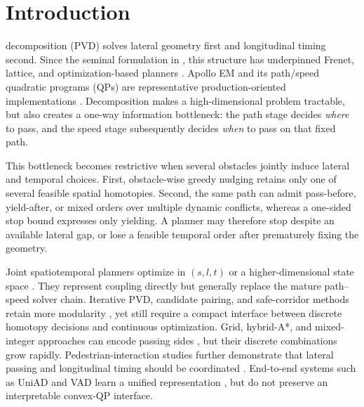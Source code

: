 \section{Introduction}
\label{sec:introduction}

 decomposition (PVD) solves lateral geometry first and longitudinal timing second. Since the seminal formulation in \cite{kant1986pvd}, this structure has underpinned Frenet, lattice, and optimization-based planners \cite{werling2010,dolgov2010,mcnaughton2011lattice,ziegler2014}. Apollo EM and its path/speed quadratic programs (QPs) are representative production-oriented implementations \cite{fan2018baidu,apollo2024,zhou2021pathqp,zhou2021dliaps}. Decomposition makes a high-dimensional problem tractable, but also creates a one-way information bottleneck: the path stage decides \emph{where} to pass, and the speed stage subsequently decides \emph{when} to pass on that fixed path.

This bottleneck becomes restrictive when several obstacles jointly induce lateral and temporal choices. First, obstacle-wise greedy nudging retains only one of several feasible spatial homotopies. Second, the same path can admit pass-before, yield-after, or mixed orders over multiple dynamic conflicts, whereas a one-sided stop bound expresses only yielding. A planner may therefore stop despite an available lateral gap, or lose a feasible temporal order after prematurely fixing the geometry.

Joint spatiotemporal planners optimize in $(s,l,t)$ or a higher-dimensional state space \cite{morsali2021svm,hu2023_hybrid_astar_slt,micheli2023nmpc,han2024efficient,guo2024joint,hu2025_dp_nmpc}. They represent coupling directly but generally replace the mature path--speed solver chain. Iterative PVD, candidate pairing, and safe-corridor methods retain more modularity \cite{chen2019em,cheng2022gp,zhang2023_dp_rcg,yoon2024stcorridor,frenetcorridor2025,tariq2026enveloping}, yet still require a compact interface between discrete homotopy decisions and continuous optimization. Grid, hybrid-A*, and mixed-integer approaches can encode passing sides \cite{kuwata2009rrt,kessler2023,narrowcorridor2022}, but their discrete combinations grow rapidly. Pedestrian-interaction studies further demonstrate that lateral passing and longitudinal timing should be coordinated \cite{crossingped2019,yangbo2023ped,pathspeedstructured2024}. End-to-end systems such as UniAD and VAD learn a unified representation \cite{hu2023uniad,jiang2023vad}, but do not preserve an interpretable convex-QP interface.

